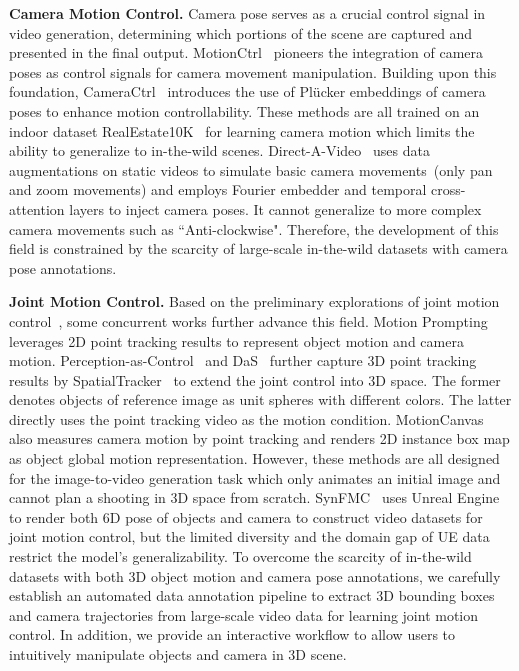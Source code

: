 \noindent\textbf{Camera Motion Control.} Camera pose serves as a crucial control signal in video generation, determining which portions of the scene are captured and presented in the final output. MotionCtrl~\cite{MotionCtrl} pioneers the integration of camera poses as control signals for camera movement manipulation. Building upon this foundation, CameraCtrl~\cite{cameractrl} introduces the use of Plücker embeddings of camera poses to enhance motion controllability. These methods are all trained on an indoor dataset RealEstate10K~\cite{realestate10k} for learning camera motion which limits the ability to generalize to in-the-wild scenes. Direct-A-Video~\cite{yang2024direct} uses data augmentations on static videos to simulate basic camera movements~(only pan and zoom movements) and employs Fourier embedder and temporal cross-attention layers to inject camera poses. It cannot generalize to more complex camera movements such as ``Anti-clockwise". Therefore, the development of this field is constrained by the scarcity of large-scale in-the-wild datasets with camera pose annotations.



\noindent\textbf{Joint Motion Control.} Based on the preliminary explorations of joint motion control~\cite{MotionCtrl,yang2024direct}, some concurrent works further advance this field. Motion Prompting~\cite{geng2024motion} leverages 2D point tracking results to represent object motion and camera motion. Perception-as-Control~\cite{chen2025perception} and DaS~\cite{shader} further capture 3D point tracking results by SpatialTracker~\cite{SpatialTracker} to extend the joint control into 3D space. The former denotes objects of reference image as unit spheres with different colors. The latter directly uses the point tracking video as the motion condition. MotionCanvas~\cite{motioncanvas}
also measures camera motion by point tracking and renders 2D instance box map as object global motion representation. However, these methods are all designed for the image-to-video generation task which only animates an initial image and cannot plan a shooting in 3D space from scratch. SynFMC~\cite{shuai2025free} uses Unreal Engine to render both 6D pose of objects and camera to construct video datasets for joint motion control, but the limited diversity and the domain gap of UE data restrict the model's generalizability. To overcome the scarcity of in-the-wild datasets with both 3D object motion and camera pose annotations, we carefully establish an automated data annotation pipeline to extract 3D bounding boxes and camera trajectories from large-scale video data for learning joint motion control. In addition, we provide an interactive workflow to allow users to intuitively manipulate objects and camera in 3D scene.